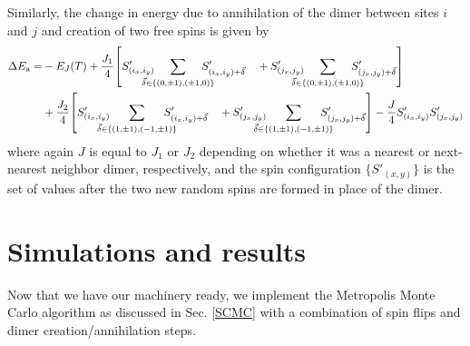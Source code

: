 \documentclass[../thesis_main.tex]{subfiles}
\begin{document}
Similarly, the change in energy due to annihilation of the dimer between sites $i$ and $j$ and creation of two free spins is given by
\begin{align*}
    \Delta E_\text{a} =  & -E_J(T) +\frac{J_1}{4} \qty[S'_{(i_x, i_y)} \!\!\!\!\!\!\!\! \sum_{\vec{\delta} \in \{(0,\pm 1), (\pm 1, 0) \}} \!\!\!\!\!\!\!\! S'_{(i_x, i_y) + \vec{\delta}} \quad + S'_{(j_x, j_y)} \!\!\!\!\!\!\!\! \sum_{\vec{\delta} \in \{(0,\pm 1), (\pm 1, 0) \}} \!\!\!\!\!\!\!\! S'_{(j_x, j_y) + \vec{\delta}}] \\
    & +\frac{J_2}{4} \qty[S'_{(i_x, i_y)} \!\!\!\!\!\!\!\! \sum_{\vec{\delta} \in \{(1,\pm 1), (-1,\pm 1) \}} \!\!\!\!\!\!\!\! S'_{(i_x, i_y) + \vec{\delta}} \quad + S'_{(j_x, j_y)} \!\!\!\!\!\!\!\! \sum_{\vec{\delta} \in \{(1,\pm 1), (-1,\pm 1) \}} \!\!\!\!\!\!\!\! S'_{(j_x, j_y) + \vec{\delta}}] - \frac{J}{4} S'_{(i_x, i_y)} S'_{(j_x, j_y)}
\end{align*}
where again $J$ is equal to $J_1$ or $J_2$ depending on whether it was a nearest or next-nearest neighbor dimer, respectively, and the spin configuration $\{S'_{(x,y)}\}$ is the set of values after the two new random spins are formed in place of the dimer.
\section{Simulations and results}
Now that we have our machinery ready, we implement the Metropolis Monte Carlo algorithm as discussed in Sec. \ref{SCMC} with a combination of spin flips and dimer creation/annihilation steps.
\end{document}
